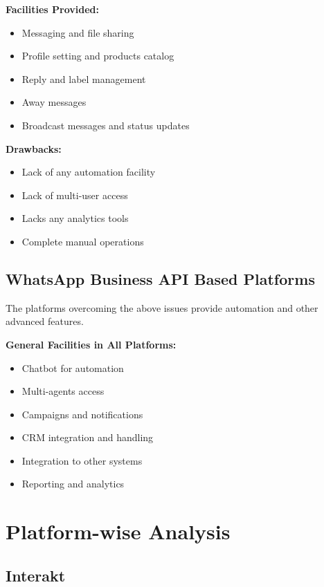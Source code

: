 \textbf{Facilities Provided:}
\begin{itemize}
    \item Messaging and file sharing
    \item Profile setting and products catalog
    \item Reply and label management
    \item Away messages
    \item Broadcast messages and status updates
\end{itemize}

\textbf{Drawbacks:}
\begin{itemize}
    \item Lack of any automation facility
    \item Lack of multi-user access
    \item Lacks any analytics tools
    \item Complete manual operations
\end{itemize}


\subsection{WhatsApp Business API Based Platforms}

The platforms overcoming the above issues provide automation and other advanced features.

\textbf{General Facilities in All Platforms:}
\begin{itemize}
    \item Chatbot for automation
    \item Multi-agents access
    \item Campaigns and notifications
    \item CRM integration and handling
    \item Integration to other systems
    \item Reporting and analytics
\end{itemize}


\section{Platform-wise Analysis}

\subsection{Interakt}

